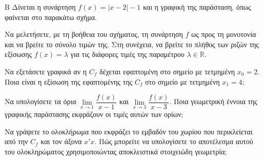 \begin{thema}{Β}
Δίνεται η συνάρτηση $f(x) = \left| x-2 \right| - 1$ και η γραφική της παράσταση, όπως φαίνεται στο παρακάτω σχήμα.
\begin{center}
\end{center}
\begin{erwthma}
  \item Να μελετήσετε, με τη βοήθεια του σχήματος, τη συνάρτηση $f$ ως προς τη μονοτονία και να βρείτε το σύνολο τιμών της. Στη συνέχεια, να βρείτε το πλήθος των ριζών της εξίσωσης $f(x) = \lambda$ για τις διάφορες τιμές της παραμέτρου $\lambda \in \mathbb{R}$.
  \item Να εξετάσετε γραφικά αν η $C_f$ δέχεται εφαπτομένη στο σημείο με τετμημένη $x_0=2$. Ποια είναι η εξίσωση της εφαπτομένης της $C_f$ στο σημείο με τετμημένη $x_1=4$;
  \item Να υπολογίσετε τα όρια $\lim\limits_{x \to 1} \dfrac{f(x)}{x-1}$ και $\lim\limits_{x \to 3} \dfrac{f(x)}{x-3}$. Ποια γεωμετρική έννοια της γραφικής παράστασης εκφράζουν οι τιμές αυτών των ορίων;
  \item Να γράψετε το ολοκλήρωμα που εκφράζει το εμβαδόν του χωρίου που περικλείεται από την $C_f$ και τον άξονα $x'x$. Πώς μπορείτε να υπολογίσετε το αποτέλεσμα αυτού του ολοκληρώματος χρησιμοποιώντας αποκλειστικά στοιχειώδη γεωμετρία;
\end{erwthma}
\end{thema}

